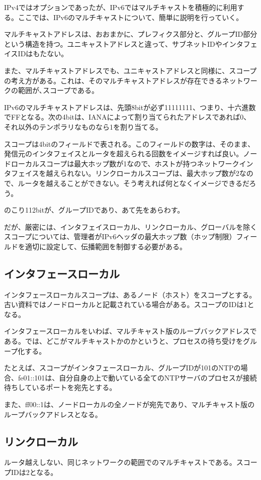 IPv4ではオプションであったが、IPv6ではマルチキャストを積極的に利用する。ここでは、IPv6のマルチキャストについて、簡単に説明を行っていく。

マルチキャストアドレスは、おおまかに、プレフィクス部分と、グループID部分という構造を持つ。ユニキャストアドレスと違って、サブネットIDやインタフェイスIDはもたない。

また、マルチキャストアドレスでも、ユニキャストアドレスと同様に、スコープの考え方がある。これは、そのマルチキャストアドレスが存在できるネットワークの範囲が､スコープである。

IPv6のマルチキャストアドレスは、先頭8bitが必ず11111111、つまり、十六進数でFFとなる。次の4bitは、IANAによって割り当てられたアドレスであれば0、それ以外のテンポラリなものなら1を割り当てる。

スコープは4bitのフィールドで表される。このフィールドの数字は、そのまま、発信元のインタフェイスとルータを超えられる回数をイメージすれば良い。ノードローカルスコープは最大ホップ数が1なので、ホストが持つネットワークインタフェイスを越えられない。リンクローカルスコープは、最大ホップ数が2なので、ルータを越えることができない。そう考えれば何となくイメージできるだろう。

のこり112bitが、グループIDであり、あて先をあらわす。

だが、厳密には、インタフェイスローカル、リンクローカル、グローバルを除くスコープについては、管理者がIPv6ヘッダの最大ホップ数（ホップ制限）フィールドを適切に設定して、伝播範囲を制御する必要がある。

\subsection{インタフェースローカル}
インタフェースローカルスコープは、あるノード（ホスト）をスコープとする。古い資料ではノードローカルと記載されている場合がある。スコープのIDは1となる。

インタフェースローカルをいわば、マルチキャスト版のループバックアドレスである。では、どこがマルチキャストかのかというと、プロセスの待ち受けをグループ化する。

たとえば、スコープがインタフェースローカル、グループIDが101のNTPの場合、fe01::101は、自分自身の上で動いている全てのNTPサーバのプロセスが接続待ちしているポートを宛先とする。

また、ff00::1は、ノードローカルの全ノードが宛先であり、マルチキャスト版のループバックアドレスとなる。

\subsection{リンクローカル}
ルータ越えしない、同じネットワークの範囲でのマルチキャストである。スコープIDは2となる。

